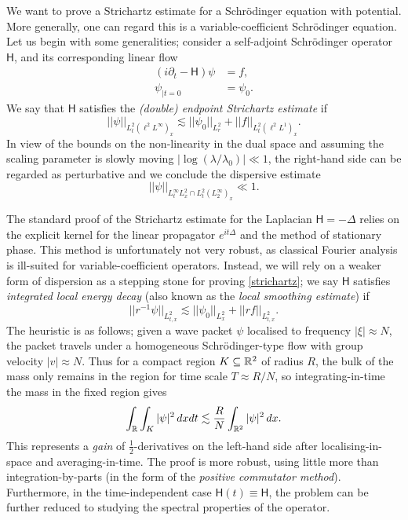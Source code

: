 We want to prove a Strichartz estimate for a Schr\"odinger equation with potential. More generally, one can regard this is a variable-coefficient Schr\"odinger equation. Let us begin with some generalities; consider a self-adjoint Schr\"odinger operator $\mathsf H$, and its corresponding linear flow 
    \begin{equation}\label{eq:generic}
        \begin{split}
            (i \partial_t - \mathsf H) \psi 
                &= f,\\
            \psi_{|t = 0}
                &= \psi_0.  
        \end{split}
    \end{equation}
We say that $\mathsf H$ satisfies the \textit{(double) endpoint Strichartz estimate} if 
    \begin{equation}\label{eq:strichartz}\tag{S}
        ||\psi||_{L^2_t (\ell^2 L^\infty)_x}    
            \lesssim ||\psi_0||_{L^2_r} + ||f||_{L^2_t (\ell^2 L^1)_x}.
    \end{equation}
In view of the bounds on the non-linearity in the dual space and assuming the scaling parameter is slowly moving $|\log(\lambda/\lambda_0)|\ll 1$, the right-hand side can be regarded as perturbative and we conclude the dispersive estimate 
    \begin{equation}\label{eq:dispersive}
        ||\psi||_{L^\infty_t L^2_x \cap {L^2_t (L^\infty_2)_x}} 
            \ll 1. 
    \end{equation}

The standard proof of the Strichartz estimate for the Laplacian $\mathsf H = -\Delta$ relies on the explicit kernel for the linear propagator $e^{it \Delta}$ and the method of stationary phase. This method is unfortunately not very robust, as classical Fourier analysis is ill-suited for variable-coefficient operators. Instead, we will rely on a weaker form of dispersion as a stepping stone for proving \eqref{strichartz}; we say $\mathsf H$ satisfies \textit{integrated local energy decay} (also known as the \textit{local smoothing estimate}) if 
    \begin{equation}\label{eq:ILED}\tag{ILED}
        ||r^{-1} \psi||_{L^2_{t, x}}
            \lesssim ||\psi_0||_{L^2_x} + ||r f||_{L^2_{t, x}}.
    \end{equation}
The heuristic is as follows; given a wave packet $\psi$ localised to frequency $|\xi| \approx N$, the packet travels under a homogeneous Schr\"odinger-type flow with group velocity $|v| \approx N$. Thus for a compact region $K \subseteq \mathbb R^2$ of radius $R$, the bulk of the mass only remains in the region for time scale $T \approx R/N$, so integrating-in-time the mass in the fixed region gives
    \[
        \int_\mathbb R \int_K |\psi|^2 \, dx dt 
            \lesssim \frac{R}{N} \int_{\mathbb R^2} |\psi|^2 \, dx. 
    \]
This represents a \textit{gain} of $\tfrac12$-derivatives on the left-hand side after localising-in-space and averaging-in-time. The proof is more robust, using little more than integration-by-parts (in the form of the \textit{positive commutator method}). Furthermore, in the time-independent case $\mathsf H(t) \equiv \mathsf H$, the problem can be further reduced to studying the spectral properties of the operator. 

